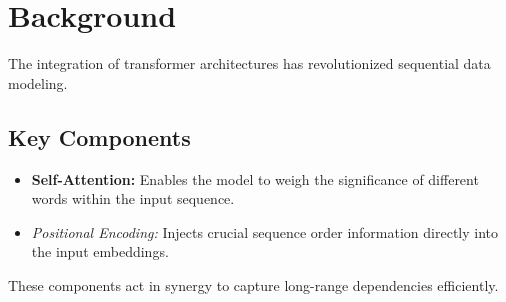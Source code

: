 \documentclass{article}
\begin{document}
\section{Background}
The integration of transformer architectures has revolutionized sequential data modeling.
\subsection{Key Components}
\begin{itemize}
    \item \textbf{Self-Attention:} Enables the model to weigh the significance of different words within the input sequence.
    \item \textit{Positional Encoding:} Injects crucial sequence order information directly into the input embeddings.
\end{itemize}
These components act in synergy to capture long-range dependencies efficiently.
\end{document}
